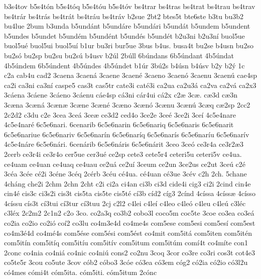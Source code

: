 {b3s4tov
b5s4t^^f3n
b5s4t^^f3q
b5s4t^^f3u
b5s4t^^f3v
bs4trar
bs4tras
bs4trat
bs4trau
bs4trav
bs4tr^^e1r
bs4tr^^e1s
bs4tr^^e1t
bs4tr^^e1u
bs4tr^^e1v
b2sue
2bt2
btes5t
bte6ste
b3tu
bu3b2
bu4lue
2bum
b3unda
b5und^^e1nt
b5und^^e1re
b5und^^e1ri
b5und^^e1t
b5undem
b5undent
b5undes
b5undet
b5und^^e9m
b5und^^e9nt
b5und^^e9s
b5und^^e9t
b2u3ni
b2u3n^^ed
buol5ue
buol5u^^e9
buol5ui
buol5u^^ed
b1ur
bu3ri
bur5ue
3bus
b4us.
busa4t
bu2se
b4usn
bu2so
bu2s^^f3
bu2sp
bu2su
bu2s^^fa
b4usv
b2^^fal
2b^^fall
6b^^fandans
6b5^^fandant
4b5^^fandat
4b5^^fandem
6b5^^fandent
4b5^^fandes
4b5^^fandet
b1^^far
3b^^fa2s
b4^^fasn
b4^^fasv
b2y
b2^^fd
1c
c2a
cab4u
cad2
3caena
3caen^^e1
3caene
3caen^^e9
3caeno
3caen^^f3
3caenu
3caen^^fa
cae4sp
ca2i
ca3ni
ca3n^^ed
caspe5
cas3t
cas5tr
cate3i
cat^^e93i
ca2ua
ca2u3^^e1
ca2va
ca2v^^e1
ca2x3
3c^^e1ena
3c^^e1ene
3c^^e1eno
3c^^e1enu
c^^e1e4sp
c^^e13ni
c^^e1r4ui
c^^e12x
c2^^e6
3c^^e6.
c^^e63d
c^^e63n
3c^^e6na
3c^^e6n^^e1
3c^^e6n^^e6
3c^^e6ne
3c^^e6n^^e9
3c^^e6no
3c^^e6n^^f3
3c^^e6nu
3c^^e6n^^fa
3c^^e6q
c^^e62sp
2cc2
2c2d2
c3du
c2e
3cea
3ce^^e1
3ce^^e6
ce3d2
ced4o
3ce2e
3ce^^e9
3ce2i
3ce^^ed
4c5e4nare
4c5e4nar^^e9
6c5e6nari.
6cenarib
6c5e6narin
6c5e6nariq
6c5e6naris
6c5e6narit
6c5e6nariue
6c5e6nariv
6c5e6nar^^edn
6c5e6nar^^edq
6c5e6nar^^eds
6c5e6nar^^edu
6c5e6nar^^edv
4c5e4n^^e1re
6c5e6n^^e1ri.
6cen^^e1rib
6c5e6n^^e1ris
6c5e6n^^e1rit
3ceo
3ce^^f3
ce3r4a
ce3r2^^e63
2cerb
ce3r4i
ce3r4o
cer5ue
cer3u^^e9
ce2sp
cete3
cete5r4
ceteri5u
ceteri5v
ce4ua.
ce4uam
ce4uan
ce4uaq
ce4uau
ce2u^^e1
ce2u^^ed
3ceum
ce2un
3ce2us
ce2ut
3ce^^fa
c2^^e9
3c^^e9a
3c^^e9e
c^^e92i
3c^^e9ne
3c^^e9q
2c^^e9rb
3c^^e9u
c^^e94ua.
c^^e94uan
c^^e93ue
3c^^e9v
c2h
2ch.
5chane
4ch^^e1ng
che2i
2chm
2chn
2cht
c2i
ci2a
ci4an
ci3b
ci3d
cide4i
cig3
ci2i
2cind
cin4e
cin4^^e9
cis3c
ci3s2i
cis3t
cis5ta
cis5te
cis5t^^e9
c^^ed3b
c^^edd2
c^^edg3
2c^^ednd
4c^^edssa
4c^^edss^^e6
4c^^edsso
4c^^edssu
c^^eds3t
c^^ed3tui
c^^ed3tur
c^^ed3tuu
2cj
c2l2
c4lei
c4le^^ed
c4leo
c4le^^f3
c4leu
c4le^^fa
c3l^^e9c
c3l^^e9x
2c2m2
2c1n2
c2o
3co.
co2a3q
co3b2
cobo3l
coco5m
coc5te
3coe
co3ea
co3e^^e1
co2ia
co2io
co2i^^f3
co^^ed2
co3lu
co4m3e4d
co4me4s
com5ese
com5esi
com5es^^ed
com5est
co4m3^^e94d
co4m^^e94s
com5^^e9se
com5^^e9si
com5^^e9st
co4mit
com5it^^e1
com5iten
com5it^^e9n
com5it^^edn
com5it^^edq
com5it^^edu
com5it^^edv
com5itum
com5it^^fam
com^^ed4t
co4m^^edte
con1
2conc
co4nia
co4ni^^e1
co4nic
co4ni^^fa
cons2
co2nu
3coq
3cor
co3re
co3ri
cos3t
cot4e3
co5te5r
3cou
co5ute
3cov
c^^f3b2
c^^f3bo3
3c^^f3e
c^^f33ea
c^^f33em
c^^f3g2
c^^f32ia
c^^f32io
c^^f33l2u
c^^f34mes
c^^f3mi4t
c^^f3m5ita.
c^^f3m5iti.
c^^f3m5itum
2c^^f3nc
}
